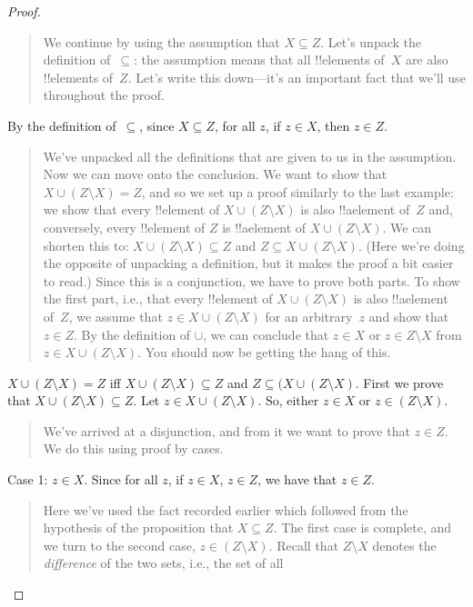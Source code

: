 \documentclass[../../../include/open-logic-section]{subfiles}
\begin{document}
\begin{proof}
\begin{quote}
    We continue by using the assumption that $X \subseteq Z$. Let's
    unpack the definition of~$\subseteq$: the assumption means that
    all !!{element}s of~$X$ are also !!{element}s of~$Z$. Let's write
    this down---it's an important fact that we'll use throughout the
    proof.
  \end{quote}
  By the definition of~$\subseteq$, since $X \subseteq Z$, for all
  $z$, if $z \in X$, then $z \in Z$.
  \begin{quote}
    We've unpacked all the definitions that are given to us in the
    assumption. Now we can move onto the conclusion. We want to show
    that $X \cup (Z \setminus X) = Z$, and so we set up a proof
    similarly to the last example: we show that every !!{element} of
    $X \cup (Z \setminus X)$ is also !!a{element} of~$Z$ and,
    conversely, every !!{element} of $Z$ is !!a{element} of $X \cup (Z
    \setminus X)$. We can shorten this to: $X \cup (Z \setminus X)
    \subseteq Z$ and $Z \subseteq X \cup (Z \setminus X)$. (Here we're
    doing the opposite of unpacking a definition, but it makes the
    proof a bit easier to read.)  Since this is a conjunction, we have
    to prove both parts. To show the first part, i.e., that every
    !!{element} of $X \cup (Z \setminus X)$ is also !!a{element}
    of~$Z$, we assume that $z \in X \cup (Z \setminus X)$ for an
    arbitrary~$z$ and show that $z \in Z$. By the definition of
    $\cup$, we can conclude that $z \in X$ or $z \in Z \setminus X$
    from $z \in X \cup (Z \setminus X)$. You should now be getting the
    hang of this.
    \end{quote}
  $X \cup (Z \setminus X) = Z$ iff $X \cup (Z \setminus X) \subseteq
  Z$ and $Z \subseteq (X \cup (Z \setminus X)$.  First we prove that
  $X \cup (Z \setminus X) \subseteq Z$.  Let $z \in X \cup (Z
  \setminus X)$. So, either $z \in X$ or $z \in (Z \setminus X)$.
  \begin{quote}
    We've arrived at a disjunction, and from it we want to prove that
    $z \in Z$. We do this using proof by cases.
  \end{quote}
  Case 1: $z \in X$. Since for all $z$, if $z \in X$, $z \in Z$, we
  have that $z \in Z$.
  \begin{quote}
    Here we've used the fact recorded earlier which followed from the
    hypothesis of the proposition that $X \subseteq Z$.  The first
    case is complete, and we turn to the second case, $z \in (Z
    \setminus X)$.  Recall that $Z \setminus X$ denotes the
    \emph{difference} of the two sets, i.e., the set of all

\end{quote}
\end{proof}
\end{document}

